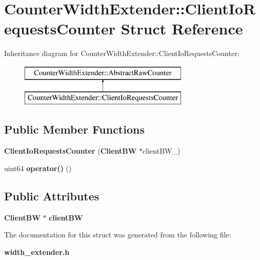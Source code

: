\section{Counter\+Width\+Extender\+:\+:Client\+Io\+Requests\+Counter Struct Reference}
\label{structCounterWidthExtender_1_1ClientIoRequestsCounter}
Inheritance diagram for Counter\+Width\+Extender\+:\+:Client\+Io\+Requests\+Counter\+:\begin{figure}[H]
\begin{center}
\leavevmode
\includegraphics[height=2.000000cm]{structCounterWidthExtender_1_1ClientIoRequestsCounter}
\end{center}
\end{figure}
\subsection*{Public Member Functions}
\begin{DoxyCompactItemize}
\item 
{\bfseries Client\+Io\+Requests\+Counter} ({\bf Client\+B\+W} $\ast$client\+B\+W\+\_\+)\label{structCounterWidthExtender_1_1ClientIoRequestsCounter_a1a86c61304158b6504c502024b85330d}

\item 
uint64 {\bfseries operator()} ()\label{structCounterWidthExtender_1_1ClientIoRequestsCounter_a13cfbc3fedce8d039b306c303f485ff8}

\end{DoxyCompactItemize}
\subsection*{Public Attributes}
\begin{DoxyCompactItemize}
\item 
{\bf Client\+B\+W} $\ast$ {\bfseries client\+B\+W}\label{structCounterWidthExtender_1_1ClientIoRequestsCounter_ac76d8b2658c854c84be327c20f075e2b}

\end{DoxyCompactItemize}


The documentation for this struct was generated from the following file\+:\begin{DoxyCompactItemize}
\item 
{\bf width\+\_\+extender.\+h}\end{DoxyCompactItemize}
